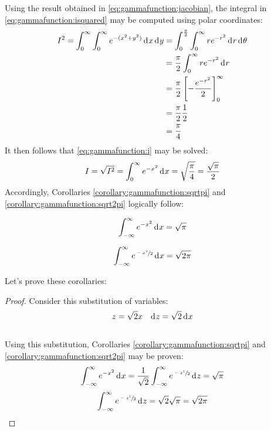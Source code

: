 \documentclass[12pt]{article}
\begin{document}
Using the result obtained in \autoref{eq:gammafunction:jacobian}, the integral in \autoref{eq:gammafunction:isquared}
may be computed using polar coordinates:
\begin{equation}
	\begin{split}
		I^2	=	\int^\infty_0\int^\infty_0 e^{-(x^2+y^2)}\mathop{}\!\mathrm{d^{}}x\mathop{}\!\mathrm{d^{}}y	&=	\int^\frac{\pi}{2}_0\int^\infty_0 re^{-r^2}\mathop{}\!\mathrm{d^{}}r\mathop{}\!\mathrm{d^{}}\theta\\
																			&=	\frac{\pi}{2}\int^\infty_0 re^{-r^2}\mathop{}\!\mathrm{d^{}}r\\
																			&=	\frac{\pi}{2}\left[-\frac{e^{-r^2}}{2}\right]^\infty_0\\
																			&=	\frac{\pi}{2}\frac{1}{2}\\
																			&=	\frac{\pi}{4}
	\end{split}
\end{equation}
It then follows that \autoref{eq:gammafunction:i} may be solved:
\begin{equation}
	I = \sqrt{I^2} = \int^\infty_0 e^{-x^2}\mathop{}\!\mathrm{d^{}}x = \sqrt{\frac{\pi}{4}} = \frac{\sqrt{\pi}}{2}
\end{equation}
Accordingly, Corollaries \autoref{corollary:gammafunction:sqrtpi} and \autoref{corollary:gammafunction:sqrt2pi}
logically follow:
\begin{corollary}\label{corollary:gammafunction:sqrtpi}
	\begin{equation}
		\int^\infty_{-\infty} e^{-x^2}\mathop{}\!\mathrm{d^{}}x = \sqrt{\pi}
	\end{equation}
\end{corollary}
\begin{corollary}\label{corollary:gammafunction:sqrt2pi}
	\begin{equation}
		\int^\infty_{-\infty} e^{\sfrac{-x^2}{2}}\mathop{}\!\mathrm{d^{}}x = \sqrt{2\pi}
	\end{equation}
\end{corollary}
\noindent Let's prove these corollaries:\\[-36pt]
\begin{proof}
	Consider this substitution of variables:\\[-36pt]
	\begin{align*}
		z = \sqrt{2}x	&&	\mathop{}\!\mathrm{d^{}}z = \sqrt{2}\mathop{}\!\mathrm{d^{}}x
	\end{align*}\\[-36pt]
	Using this substitution, Corollaries \autoref{corollary:gammafunction:sqrtpi} and
	\autoref{corollary:gammafunction:sqrt2pi} may be proven:\\[-18pt]
	\begin{equation}
		\int^\infty_{-\infty} e^{-x^2}\mathop{}\!\mathrm{d^{}}x = \frac{1}{\sqrt{2}}\int^\infty_{-\infty} e^{\sfrac{-z^2}{2}}\mathop{}\!\mathrm{d^{}}z = \sqrt{\pi}\\
	\end{equation}
	\vspace*{-30pt}
	\begin{equation}
		\int^\infty_{-\infty} e^{\sfrac{-z^2}{2}}\mathop{}\!\mathrm{d^{}}z = \sqrt{2}\sqrt{\pi} = \sqrt{2\pi}
	\end{equation}
\end{proof}
\end{document}
